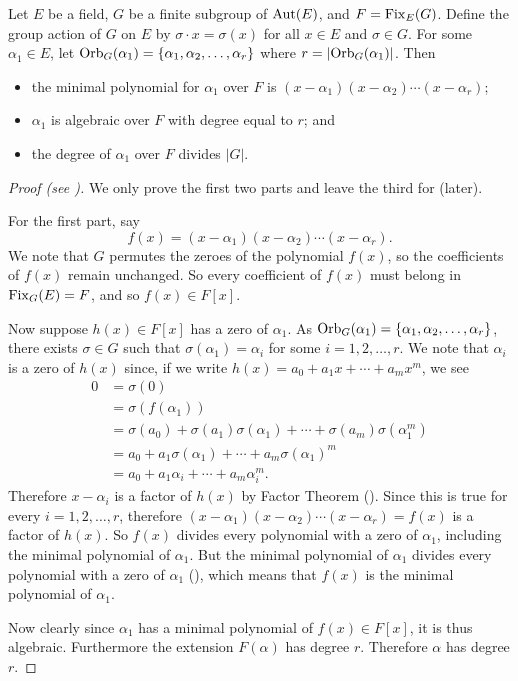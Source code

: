 \begin{theorem}\label{thrm-degree-of-element-under-fixed-field-action}
    Let $E$ be a field, $G$ be a finite subgroup of $\mathrm{Aut}(E)$, and $F = \mathrm{Fix}_{E}(G)$. Define the group action of $G$ on $E$ by $\sigma \cdot x = \sigma(x)$ for all $x \in E$ and $\sigma \in G$. For some $\alpha_1 \in E$, let $\mathrm{Orb}_{G}(\alpha_1) = \{\alpha_1, \alpha_2, \dots, \alpha_r\}$ where $r = |\mathrm{Orb}_{G}(\alpha_1)|$. Then
    \begin{itemize}
        \item the minimal polynomial for $\alpha_1$ over $F$ is $(x-\alpha_1)(x-\alpha_2)\cdots(x-\alpha_r)$;
        \item $\alpha_1$ is algebraic over $F$ with degree equal to $r$; and
        \item the degree of $\alpha_1$ over $F$ divides $|G|$.
    \end{itemize}
\end{theorem}
\begin{proof}[Proof (see {\cite[Theorem 16.5.2]{artin_2011}})]
    We only prove the first two parts and leave the third for  (later).

    For the first part, say
    \[
        f(x) = (x-\alpha_1)(x-\alpha_2)\cdots(x-\alpha_r).
    \]
    We note that $G$ permutes the zeroes of the polynomial $f(x)$, so the coefficients of $f(x)$ remain unchanged. So every coefficient of $f(x)$ must belong in $\mathrm{Fix}_{G}(E) = F$, and so $f(x) \in F[x]$.

    Now suppose $h(x) \in F[x]$ has a zero of $\alpha_1$. As $\mathrm{Orb}_{G}(\alpha_1) = \{\alpha_1, \alpha_2, \dots, \alpha_r\}$, there exists $\sigma \in G$ such that $\sigma(\alpha_1) = \alpha_i$ for some $i = 1, 2, \dots, r$. We note that $\alpha_i$ is a zero of $h(x)$ since, if we write $h(x) = a_0 + a_1x + \cdots + a_mx^m$, we see
    \begin{align*}
        0 &= \sigma(0)\\
        &= \sigma(f(\alpha_1))\\
        &= \sigma(a_0) + \sigma(a_1)\sigma(\alpha_1) + \cdots + \sigma(a_m)\sigma(\alpha_1^m)\\
        &= a_0 + a_1\sigma(\alpha_1) + \cdots + a_m\sigma(\alpha_1)^m\\
        &= a_0 + a_1\alpha_i + \cdots + a_m\alpha_i^m.
    \end{align*}
    Therefore $x - \alpha_i$ is a factor of $h(x)$ by Factor Theorem (). Since this is true for every $i = 1, 2, \dots, r$, therefore $(x-\alpha_1)(x-\alpha_2)\cdots(x-\alpha_r) = f(x)$ is a factor of $h(x)$. So $f(x)$ divides every polynomial with a zero of $\alpha_1$, including the minimal polynomial of $\alpha_1$. But the minimal polynomial of $\alpha_1$ divides every polynomial with a zero of $\alpha_1$ (), which means that $f(x)$ is the minimal polynomial of $\alpha_1$.

    Now clearly since $\alpha_1$ has a minimal polynomial of $f(x) \in F[x]$, it is thus algebraic. Furthermore the extension $F(\alpha)$ has degree $r$. Therefore $\alpha$ has degree $r$.
\end{proof}

